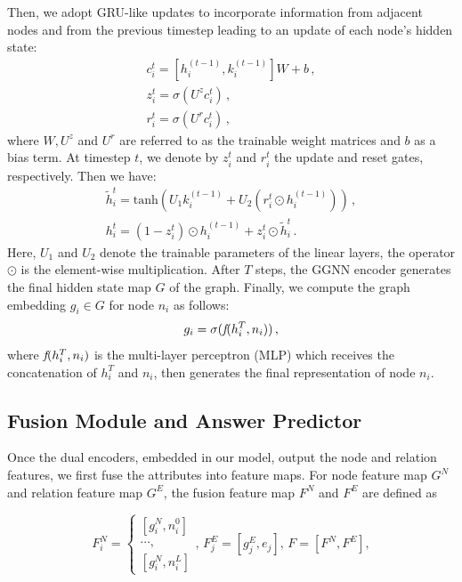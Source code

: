 \documentclass[letterpaper]{article} %
\begin{document}
Then, we adopt GRU-like updates to incorporate information from adjacent nodes and from the previous timestep leading to an update of each node's hidden state:
\begin{gather}
    c_i^t = [h_i^{(t-1)}, k_{i}^{(t-1)}] W + b \, ,\\
    z_i^t = \sigma(U^z c_i^t) \, , \\
    r_i^t = \sigma(U^r c_i^t)\, , 
\end{gather}
where $W, U^z$ and $U^r$ are referred to as the trainable weight matrices and $b$ as a bias term.
At timestep $t$, we denote by $z_i^t$ and $r_i^t$ the update and reset gates, respectively. Then we have:
\begin{gather}
    \tilde{h}_i^t = \text{tanh}(U_1 k_{i}^{(t-1)} + U_2(r_i^t \odot h_i^{(t-1)})) \, ,\\
    h_i^t = (1-z_i^t)\odot h_i^{(t-1)} + z_i^t\odot \tilde{h}_i^t \, .
\end{gather}
Here, $U_1$ and $U_2$ denote the trainable parameters of the linear layers, the operator $\odot$ is the element-wise multiplication.
After $T$ steps, the GGNN encoder generates the final hidden state map $G$ of the graph. 
Finally, we compute the graph embedding $g_i \in G$ for node ${n}_i$ as follows:
\begin{equation}
    g_i = \sigma( \emph{f}(h_i^T, n_i)) \, ,
\end{equation}
where $\emph{f}(h_i^T, n_i)$ is the multi-layer perceptron (MLP) which receives the concatenation of $h_i^T$ and $n_i$, then generates the final representation of node ${n}_i$. 

\subsection{Fusion Module and Answer Predictor}

Once the dual encoders, embedded in our model, output the node and relation features, we first fuse the attributes into feature maps. 
For node feature map $G^N$ and relation feature map $G^E$, the fusion feature map $F^N$ and $F^E$ are defined as

{\small \begin{equation}
F_i^N= \begin{cases}
[g_i^N, n_i^0]  \\
\cdots, \\
[g_i^N, n_i^L]
\end{cases} 
,\, F_j^E = [g_j^E, e_j] , \,
    F = [F^N, F^E]  ,
\end{equation}
}
\end{document}
